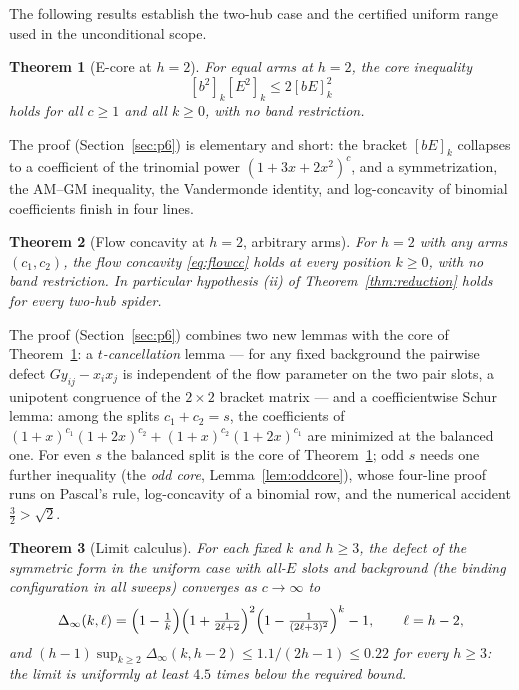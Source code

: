 \documentclass[11pt]{article}
\newtheorem{theorem}{Theorem}[section]
\theoremstyle{definition}
\begin{document}
The following results establish the two-hub case and the certified
uniform range used in the unconditional scope.

\begin{theorem}[E-core at $h=2$]\label{thm:h2}
For equal arms at $h=2$, the core inequality
\[
  [b^2]_k[E^2]_k\le 2[bE]_k^2
\]
holds for all $c\ge1$ and all $k\ge0$, with no band restriction.
\end{theorem}

The proof (Section~\ref{sec:p6}) is elementary and short: the bracket
$[bE]_k$ collapses to a coefficient of the trinomial power
$(1+3x+2x^2)^c$, and a symmetrization, the AM--GM inequality, the
Vandermonde identity, and log-concavity of binomial coefficients finish
in four lines.

\begin{theorem}[Flow concavity at $h=2$, arbitrary arms]\label{thm:h2mixed}
For $h=2$ with any arms $(c_1,c_2)$, the flow concavity
\eqref{eq:flowcc} holds at every position $k\ge0$, with no band
restriction.  In particular hypothesis (ii) of
Theorem~\ref{thm:reduction} holds for every two-hub spider.
\end{theorem}

The proof (Section~\ref{sec:p6}) combines two new lemmas with the
core of Theorem~\ref{thm:h2}: a \emph{$t$-cancellation} lemma --- for
any fixed background the pairwise defect $G y_{ij}-x_ix_j$ is
independent of the flow parameter on the two pair slots, a unipotent
congruence of the $2\times2$ bracket matrix --- and a
coefficientwise Schur lemma: among the splits $c_1+c_2=s$, the
coefficients of $(1+x)^{c_1}(1+2x)^{c_2}+(1+x)^{c_2}(1+2x)^{c_1}$ are
minimized at the balanced one.  For even $s$ the balanced split is
the core of Theorem~\ref{thm:h2}; odd $s$ needs one further
inequality (the \emph{odd core}, Lemma~\ref{lem:oddcore}), whose
four-line proof runs on Pascal's rule, log-concavity of a binomial
row, and the numerical accident $\tfrac32>\sqrt2$.

\begin{theorem}[Limit calculus]\label{thm:limit}
For each fixed $k$ and $h\ge3$, the defect of the symmetric form in
the uniform case with all-$E$ slots and background (the binding
configuration in all sweeps) converges as $c\to\infty$ to
\[
  \Delta_\infty(k,\ell)=\Bigl(1-\tfrac1k\Bigr)
  \Bigl(1+\tfrac1{2\ell+2}\Bigr)^{2}
  \Bigl(1-\tfrac1{(2\ell+3)^2}\Bigr)^{k}-1,
  \qquad \ell=h-2,
\]
and $(h-1)\sup_{k\ge2}\Delta_\infty(k,h-2)\le 1.1/(2h-1)\le 0.22$
for every $h\ge 3$: the limit is uniformly at least $4.5$ times below
the required bound.
\end{theorem}
\end{document}
